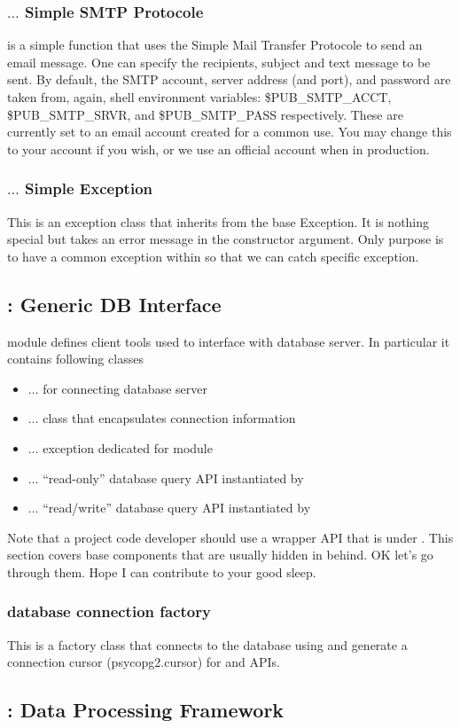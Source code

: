 \subsubsection{{\pubsmtp} $\ldots$ Simple SMTP Protocole}
{\pubsmtp} is a simple function that uses the Simple Mail Transfer Protocole to
send an email message. One can specify the recipients, subject and text message
to be sent. By default, the SMTP account, server address (and port), and password
 are taken from, again, shell environment variables: {\ttfamily \$PUB\_SMTP\_ACCT}, 
{\ttfamily \$PUB\_SMTP\_SRVR}, and {\ttfamily \$PUB\_SMTP\_PASS} respectively.
These are currently set to an email account created for a common use. You may change
this to your account if you wish, or we use an official account when in production.

\subsubsection{{\pubexception} $\ldots$ Simple Exception}
This is an exception class that inherits from the base {\python} {\ttfamily Exception}.
It is nothing special but takes an error message in the constructor argument.
Only purpose is to have a common exception within {\pubs} so that we can catch {\pubs}
specific exception.

\subsection{{\pubdbi}: Generic DB Interface}
{\pubdbi} module defines client tools used to interface with {\psql} database server.
In particular it contains following classes
\begin{itemize}
  \item {\pubdbconn} $\ldots$ for connecting database server
  \item {\pubdbdata} $\ldots$ class that encapsulates connection information 
  \item {\pubdbexception} $\ldots$ exception dedicated for {\pubdbi} module
  \item {\pubdbreader} $\dots$ ``read-only'' database query API instantiated by {\pubdbconn}
  \item {\pubdbwriter} $\dots$ ``read/write'' database query API instantiated by {\pubdbconn}
\end{itemize}
Note that a project code developer should use a wrapper API that is under {\dstream}.
This section covers base components that are usually hidden in behind.
OK let's go through them. Hope I can contribute to your good sleep.

\subsubsection{{\pubdbconn} database connection factory}
This is a factory class that connects to the database using {\psycopg} and generate
a connection cursor ({\ttfamily psycopg2.cursor}) for {\pubdbreader} and {\pubdbwriter}
APIs.

\subsection{{\dstream}: Data Processing Framework}
